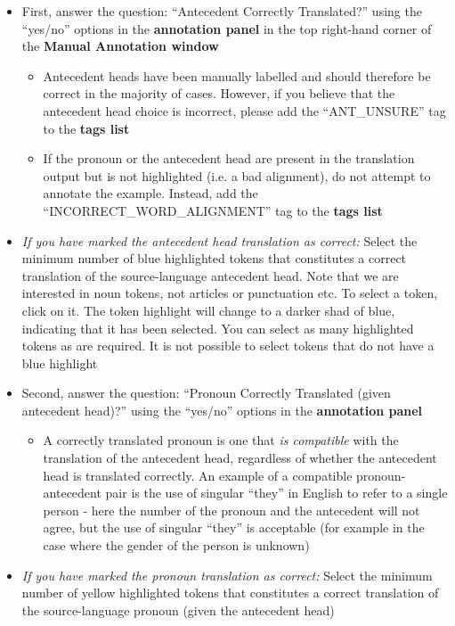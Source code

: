 \documentclass[11pt]{article} %
\begin{document}
\begin{itemize}
  \item First, answer the question: ``Antecedent Correctly Translated?'' using the ``yes/no'' options in the \textbf{annotation panel} in the top right-hand corner of the \textbf{Manual Annotation window}
  \begin{itemize}
    \item Antecedent heads have been manually labelled and should therefore be correct in the majority of cases. However, if you believe that the antecedent head choice is incorrect, please add the ``ANT\_UNSURE'' tag to the \textbf{tags list}
    \item If the pronoun or the antecedent head are present in the translation output but is not highlighted (i.e. a bad alignment), do not attempt to annotate the example. Instead, add the ``INCORRECT\_WORD\_ALIGNMENT'' tag to the \textbf{tags list}
  \end{itemize}  
  \item \textit{If you have marked the antecedent head translation as correct:} Select the minimum number of blue highlighted tokens that constitutes a correct translation of the source-language antecedent head. Note that we are interested in noun tokens, not articles or punctuation etc. To select a token, click on it. The token highlight will change to a darker shad of blue, indicating that it has been selected. You can select as many highlighted tokens as are required. It is not possible to select tokens that do not have a blue highlight
  \item Second, answer the question: ``Pronoun Correctly Translated (given antecedent head)?'' using the ``yes/no'' options in the \textbf{annotation panel}
  \begin{itemize}
    \item A correctly translated pronoun is one that \textit{is compatible} with the translation of the antecedent head, regardless of whether the antecedent head is translated correctly. An example of a compatible pronoun-antecedent pair is the use of singular ``they'' in English to refer to a single person - here the number of the pronoun and the antecedent will not agree, but the use of singular ``they'' is acceptable (for example in the case where the gender of the person is unknown)
  \end{itemize}
  \item \textit{If you have marked the pronoun translation as correct:} Select the minimum number of yellow highlighted tokens that constitutes a correct translation of the source-language pronoun (given the antecedent head)
\end{itemize}
\end{document}
